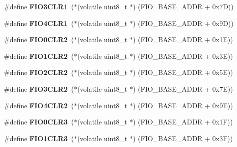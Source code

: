 \begin{DoxyCompactItemize}
\#define {\bfseries F\+I\+O3\+C\+L\+R1}~($\ast$(volatile uint8\+\_\+t $\ast$) (F\+I\+O\+\_\+\+B\+A\+S\+E\+\_\+\+A\+D\+DR + 0x7\+D))
\item 
\mbox{\label{group__lpc24xx__regs_ga09951ad749690934178cc9d9753bed84}} 
\#define {\bfseries F\+I\+O4\+C\+L\+R1}~($\ast$(volatile uint8\+\_\+t $\ast$) (F\+I\+O\+\_\+\+B\+A\+S\+E\+\_\+\+A\+D\+DR + 0x9\+D))
\item 
\mbox{\label{group__lpc24xx__regs_ga5f7e5efeba8bde2cba999e2c01fa6ced}} 
\#define {\bfseries F\+I\+O0\+C\+L\+R2}~($\ast$(volatile uint8\+\_\+t $\ast$) (F\+I\+O\+\_\+\+B\+A\+S\+E\+\_\+\+A\+D\+DR + 0x1\+E))
\item 
\mbox{\label{group__lpc24xx__regs_ga2930364287237b9c9648772985332a93}} 
\#define {\bfseries F\+I\+O1\+C\+L\+R2}~($\ast$(volatile uint8\+\_\+t $\ast$) (F\+I\+O\+\_\+\+B\+A\+S\+E\+\_\+\+A\+D\+DR + 0x3\+E))
\item 
\mbox{\label{group__lpc24xx__regs_gae474c25bb08ce82cd92410b6019a75f2}} 
\#define {\bfseries F\+I\+O2\+C\+L\+R2}~($\ast$(volatile uint8\+\_\+t $\ast$) (F\+I\+O\+\_\+\+B\+A\+S\+E\+\_\+\+A\+D\+DR + 0x5\+E))
\item 
\mbox{\label{group__lpc24xx__regs_ga1a7a4d8573cebcfb227ddc3fe1a63858}} 
\#define {\bfseries F\+I\+O3\+C\+L\+R2}~($\ast$(volatile uint8\+\_\+t $\ast$) (F\+I\+O\+\_\+\+B\+A\+S\+E\+\_\+\+A\+D\+DR + 0x7\+E))
\item 
\mbox{\label{group__lpc24xx__regs_ga7bb00c4a2515fd900ea50f0bf9cf3143}} 
\#define {\bfseries F\+I\+O4\+C\+L\+R2}~($\ast$(volatile uint8\+\_\+t $\ast$) (F\+I\+O\+\_\+\+B\+A\+S\+E\+\_\+\+A\+D\+DR + 0x9\+E))
\item 
\mbox{\label{group__lpc24xx__regs_gaa93da6ddf56c52b2a669aaa5abd331e3}} 
\#define {\bfseries F\+I\+O0\+C\+L\+R3}~($\ast$(volatile uint8\+\_\+t $\ast$) (F\+I\+O\+\_\+\+B\+A\+S\+E\+\_\+\+A\+D\+DR + 0x1\+F))
\item 
\mbox{\label{group__lpc24xx__regs_ga80790e434457c23ef3b83121b2d44cb9}} 
\#define {\bfseries F\+I\+O1\+C\+L\+R3}~($\ast$(volatile uint8\+\_\+t $\ast$) (F\+I\+O\+\_\+\+B\+A\+S\+E\+\_\+\+A\+D\+DR + 0x3\+F))

\end{DoxyCompactItemize}
